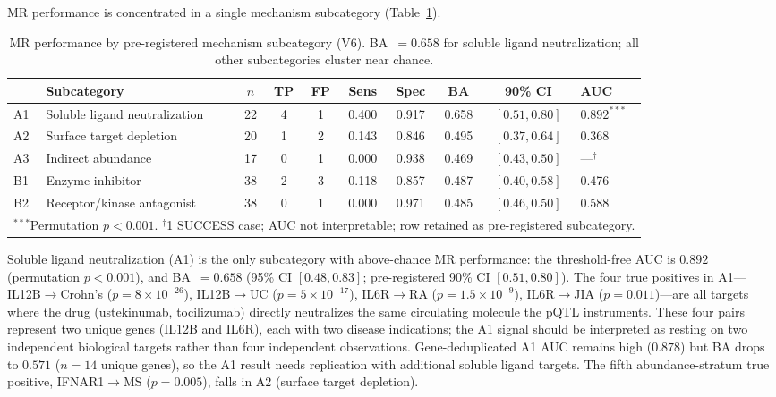 \documentclass[11pt]{article}
\begin{document}
MR performance is concentrated in a single mechanism subcategory (Table~\ref{tab:gradient}).

\begin{table}[t]
\centering
\caption{MR performance by pre-registered mechanism subcategory (V6). BA~$= 0.658$ for soluble ligand neutralization; all other subcategories cluster near chance.}
\label{tab:gradient}
\small
\begin{tabular}{llcccccccl}
\toprule
& Subcategory & $n$ & TP & FP & Sens & Spec & BA & 90\% CI & AUC \\
\midrule
A1 & Soluble ligand neutralization & 22 & 4 & 1 & 0.400 & 0.917 & 0.658 & $[0.51, 0.80]$ & $0.892^{***}$ \\
A2 & Surface target depletion & 20 & 1 & 2 & 0.143 & 0.846 & 0.495 & $[0.37, 0.64]$ & 0.368 \\
A3 & Indirect abundance & 17 & 0 & 1 & 0.000 & 0.938 & 0.469 & $[0.43, 0.50]$ & ---$^\dagger$ \\
B1 & Enzyme inhibitor & 38 & 2 & 3 & 0.118 & 0.857 & 0.487 & $[0.40, 0.58]$ & 0.476 \\
B2 & Receptor/kinase antagonist & 38 & 0 & 1 & 0.000 & 0.971 & 0.485 & $[0.46, 0.50]$ & 0.588 \\
\bottomrule
\multicolumn{10}{l}{\scriptsize $^{***}$Permutation $p < 0.001$. $^\dagger$1 SUCCESS case; AUC not interpretable; row retained as pre-registered subcategory.} \\
\end{tabular}
\normalsize
\end{table}

Soluble ligand neutralization (A1) is the only subcategory with above-chance MR performance: the threshold-free AUC is $0.892$ (permutation $p < 0.001$), and BA~$= 0.658$ (95\% CI $[0.48, 0.83]$; pre-registered 90\% CI $[0.51, 0.80]$). The four true positives in A1---IL12B$\rightarrow$Crohn's ($p = 8 \times 10^{-26}$), IL12B$\rightarrow$UC ($p = 5 \times 10^{-17}$), IL6R$\rightarrow$RA ($p = 1.5 \times 10^{-9}$), IL6R$\rightarrow$JIA ($p = 0.011$)---are all targets where the drug (ustekinumab, tocilizumab) directly neutralizes the same circulating molecule the pQTL instruments. These four pairs represent two unique genes (IL12B and IL6R), each with two disease indications; the A1 signal should be interpreted as resting on two independent biological targets rather than four independent observations. Gene-deduplicated A1 AUC remains high ($0.878$) but BA drops to $0.571$ ($n = 14$ unique genes), so the A1 result needs replication with additional soluble ligand targets. The fifth abundance-stratum true positive, IFNAR1$\rightarrow$MS ($p = 0.005$), falls in A2 (surface target depletion).
\end{document}
